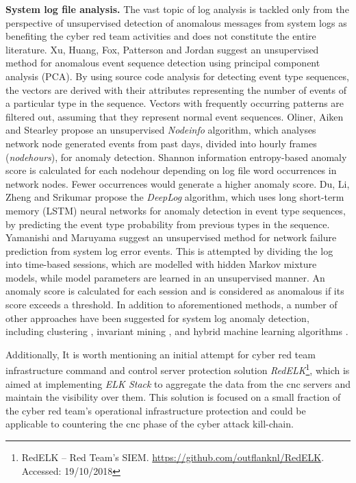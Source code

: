 \textbf{System log file analysis.}
The vast topic of log analysis is tackled only from the perspective of unsupervised detection of anomalous messages from system logs as benefiting the cyber red team activities and does not constitute the entire literature.
Xu, Huang, Fox, Patterson and Jordan \cite{Xu2009} suggest an unsupervised method for anomalous event sequence detection using principal component analysis (PCA). By using source code analysis for detecting event type sequences, the vectors are derived with their attributes representing the number of events of a particular type in the sequence. Vectors with frequently occurring patterns are filtered out, assuming that they represent normal event sequences.
Oliner, Aiken and Stearley \cite{Oliner2008} propose an unsupervised \textit{Nodeinfo} algorithm, which analyses network node generated events from past days, divided into hourly frames (\textit{nodehours}), for anomaly detection. Shannon information entropy-based anomaly score is calculated for each nodehour depending on log file word occurrences in network nodes. Fewer occurrences would generate a higher anomaly score.
Du, Li, Zheng and Srikumar \cite{Du2017} propose the \textit{DeepLog} algorithm, which uses long short-term memory (LSTM) neural networks for anomaly detection in event type sequences, by predicting the event type probability from previous types in the sequence.
Yamanishi and Maruyama \cite{Yamanishi2005} suggest an unsupervised method for network failure prediction from system log error events. This is attempted by dividing the log into time-based sessions, which are modelled with hidden Markov mixture models, while model parameters are learned in an unsupervised manner. An anomaly score is calculated for each session and is considered as anomalous if its score exceeds a threshold.
In addition to aforementioned methods, a number of other approaches have been suggested for system log anomaly detection, including clustering \cite{Makanju2012}, invariant mining \cite{Lou2010}, and hybrid machine learning algorithms \cite{Liu2018}.

Additionally, It is worth mentioning an initial attempt for cyber red team infrastructure command and control server protection solution \textit{RedELK}\footnote{RedELK -- Red Team's SIEM. \url{https://github.com/outflanknl/RedELK}. Accessed: 19/10/2018}, which is aimed at implementing \textit{ELK Stack} to aggregate the data from the \gls{cnc} servers and maintain the visibility over them. This solution is focused on a small fraction of the cyber red team's operational infrastructure protection and could be applicable to countering the \gls{cnc} phase of the cyber attack kill-chain.


